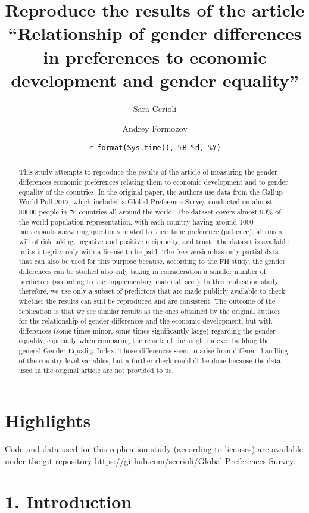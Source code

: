 \documentclass[
  11pt,
]{article}
\title{\textbf{Reproduce the results of the article ``Relationship of gender
differences in preferences to economic development and gender
equality''}}
\author{Sara Cerioli \and Andrey Formozov}
\date{\texttt{r\ format(Sys.time(),\ \textquotesingle{}\%B\ \%d,\ \%Y\textquotesingle{})}}
\begin{document}
\maketitle
\begin{abstract}
This study attempts to reproduce the results of the article of
\textcite{FH} measuring the gender differences economic preferences
relating them to economic development and to gender equality of the
countries. In the original paper, the authors use data from the Gallup
World Poll 2012, which included a Global Preference Survey conducted on
almost 80000 people in 76 countries all around the world. The dataset
covers almost 90\% of the world population representation, with each
country having around 1000 participants answering questions related to
their time preference (patience), altruism, will of risk taking,
negative and positive reciprocity, and trust. The dataset is available
in its integrity only with a license to be paid. The free version has
only partial data that can also be used for this purpose because,
according to the FH study, the gender differences can be studied also
only taking in consideration a smaller number of predictors (according
to the supplementary material, see \autocite{FH_SM}). In this
replication study, therefore, we use only a subset of predictors that
are made publicly available to check whether the results can still be
reproduced and are consistent. The outcome of the replication is that we
see similar results as the ones obtained by the original authors for the
relationship of gender differences and the economic development, but
with differences (some times minor, some times significantly large)
regarding the gender equality, especially when comparing the results of
the single indexes building the general Gender Equality Index. Those
differences seem to arise from different handling of the country-level
variables, but a further check couldn't be done because the data used in
the original article are not provided to us.
\end{abstract}

\hypertarget{highlights}{%
\section{Highlights}\label{highlights}}

Code and data used for this replication study (according to licenses)
are available under the git repository
\url{https://github.com/scerioli/Global-Preferences-Survey}.

\hypertarget{introduction}{%
\section{1. Introduction}\label{introduction}}
\end{document}
